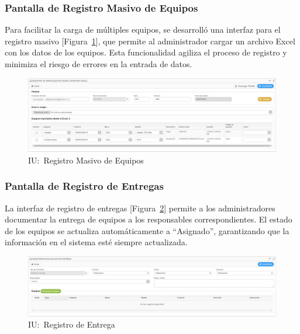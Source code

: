 \documentclass[stu, 12pt, letterpaper, donotrepeattitle, floatsintext, natbib]{apa7}
\begin{document}
\subsubsection{Pantalla de Registro Masivo de Equipos}
Para facilitar la carga de múltiples equipos, se desarrolló una interfaz para el registro masivo [Figura~\ref{equipoMasivo}], que permite al
administrador cargar un archivo Excel con los datos de los equipos. Esta funcionalidad agiliza el proceso de registro y minimiza el riesgo de
errores en la entrada de datos.
\begin{figure}[H]
    \centering
    \caption{IU:~Registro Masivo de Equipos}\label{equipoMasivo}
    \includegraphics[width=16.5cm]{./images/equipoMasivo.png}
\end{figure}
\subsubsection{Pantalla de Registro de Entregas}
La interfaz de registro de entregas [Figura~\ref{entrega}] permite a los administradores documentar la entrega de equipos a los responsables
correspondientes. El estado de los equipos se actualiza automáticamente a ``Asignado'', garantizando que la información en el sistema esté
siempre actualizada.
\begin{figure}[H]
    \centering
    \caption{IU:~Registro de Entrega}\label{entrega}
    \includegraphics[width=16.5cm]{./images/entregaEquipo.png}
\end{figure}
\end{document}
